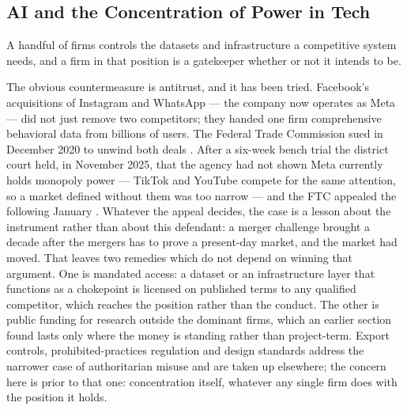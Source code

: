 \subsection{AI and the Concentration of Power in Tech}
\label{sec:concentration-power}
A handful of firms controls the datasets and infrastructure a competitive system needs, and a firm in that position is a gatekeeper whether or not it intends to be.

The obvious countermeasure is antitrust, and it has been tried. Facebook's acquisitions of Instagram and WhatsApp — the company now operates as Meta — did not just remove two competitors; they handed one firm comprehensive behavioral data from billions of users. The Federal Trade Commission sued in December 2020 to unwind both deals \autocite{ftc2020metaplatforms}. After a six-week bench trial the district court held, in November 2025, that the agency had not shown Meta currently holds monopoly power — TikTok and YouTube compete for the same attention, so a market defined without them was too narrow — and the FTC appealed the following January \autocite{ftc2025metaopinion,ftc2026metaappeal}. Whatever the appeal decides, the case is a lesson about the instrument rather than about this defendant: a merger challenge brought a decade after the mergers has to prove a present-day market, and the market had moved. That leaves two remedies which do not depend on winning that argument. One is mandated access: a dataset or an infrastructure layer that functions as a chokepoint is licensed on published terms to any qualified competitor, which reaches the position rather than the conduct. The other is public funding for research outside the dominant firms, which an earlier section found lasts only where the money is standing rather than project-term. Export controls, prohibited-practices regulation and design standards address the narrower case of authoritarian misuse and are taken up elsewhere; the concern here is prior to that one: concentration itself, whatever any single firm does with the position it holds.
